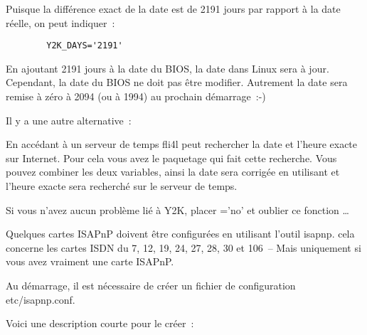 \begin{description}

  Puisque la différence exact de la date est de 2191 jours par rapport à
  la date réelle, on peut indiquer~:

\begin{example}
\begin{verbatim}
        Y2K_DAYS='2191'
\end{verbatim}
\end{example}

  En ajoutant 2191 jours à la date du BIOS, la date dans Linux
  sera à jour. Cependant, la date du BIOS ne doit pas être modifier.
  Autrement la date sera remise à zéro à 2094 (ou à 1994) au
  prochain démarrage~:-)
\end{description}

  Il y a une autre alternative~:

  En accédant à un serveur de temps fli4l peut rechercher la date et
  l'heure exacte sur Internet. Pour cela vous avez le paquetage
   qui fait cette recherche. Vous pouvez
  combiner les deux variables, ainsi la date sera corrigée en utilisant
   et l'heure exacte sera recherché sur le serveur de temps.

  Si vous n'avez aucun problème lié à Y2K, placer ='no'
  et oublier ce fonction \ldots



  Quelques cartes ISAPnP doivent être configurées en utilisant
  l'outil isapnp. cela concerne les cartes ISDN du  7, 12, 19,
  24, 27, 28, 30 et 106~-- Mais uniquement si vous avez vraiment une carte ISAPnP.

  Au démarrage, il est nécessaire de créer un fichier de configuration etc/isapnp.conf.

  Voici une description courte pour le créer~:

